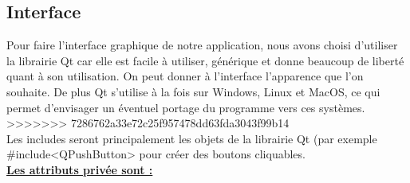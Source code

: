 \documentclass[a4paper,11pt]{article}
\begin{document}
		\subsection{Interface}
			Pour faire l'interface graphique de notre application, nous avons choisi d'utiliser la librairie Qt car elle est facile à utiliser, générique et donne beaucoup de liberté quant à son utilisation. 
			On peut donner à l’interface l’apparence que l’on souhaite. 
			De plus Qt s’utilise à la fois sur Windows, Linux et MacOS, ce qui permet d'envisager un éventuel portage du programme vers ces systèmes.\\

>>>>>>> 7286762a33e72c25f957478dd63fda3043f99b14
			\\
			Les includes seront principalement les objets de la librairie Qt (par exemple \#include<QPushButton> pour créer des boutons cliquables.
			\\
			\underline{\bf Les attributs privée sont :}\\
\end{document}
